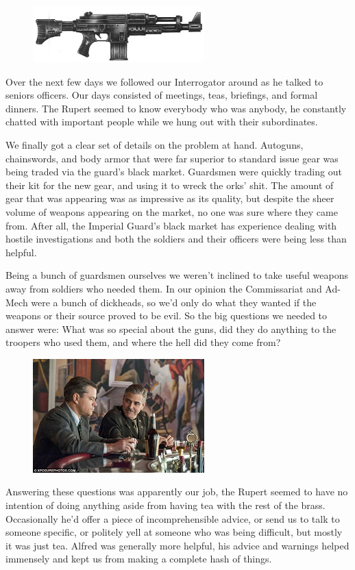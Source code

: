 \begin{figure}
	\begin{center}
		\includegraphics[width=\figwidth]{pics/4/8.png}
	\end{center}
\end{figure}
Over the next few days we followed our Interrogator around as he talked to seniors officers. 
Our days consisted of meetings, teas, briefings, and formal dinners.
The Rupert seemed to know everybody who was anybody, he constantly chatted with important people while we hung out with their subordinates.

We finally got a clear set of details on the problem at hand. 
Autoguns, chainswords, and body armor that were far superior to standard issue gear was being traded via the guard's black market. 
Guardsmen were quickly trading out their kit for the new gear, and using it to wreck the orks' shit. 
The amount of gear that was appearing was as impressive as its quality, but despite the sheer volume of weapons appearing on the market, no one was sure where they came from. 
After all, the Imperial Guard's black market has experience dealing with hostile investigations and both the soldiers and their officers were being less than helpful.

Being a bunch of guardsmen ourselves we weren't inclined to take useful weapons away from soldiers who needed them. 
In our opinion the Commissariat and Ad-Mech were a bunch of dickheads, so we'd only do what they wanted if the weapons or their source proved to be evil. 
So the big questions we needed to answer were: 
What was so special about the guns, did they do anything to the troopers who used them, and where the hell did they come from?

\begin{figure}
	\begin{center}
		\includegraphics[width=\figwidth]{pics/4/9.png}
	\end{center}
\end{figure}
Answering these questions was apparently our job, the Rupert seemed to have no intention of doing anything aside from having tea with the rest of the brass.
Occasionally he'd offer a piece of incomprehensible advice, or send us to talk to someone specific, or politely yell at someone who was being difficult, but mostly it was just tea. 
Alfred was generally more helpful, his advice and warnings helped immensely and kept us from making a complete hash of things.

